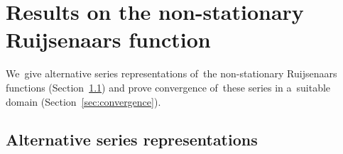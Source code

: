 \section{Results on the non-stationary Ruijsenaars function}\label{sec:results}

We~give alternative series representations of~the non-stationary Ruijsenaars functions (Section~\ref{sec:alternative}) and prove convergence of~these series in a~suitable domain (Section~\ref{sec:convergence}).
\subsection{Alternative series representations}
\label{sec:alternative}
